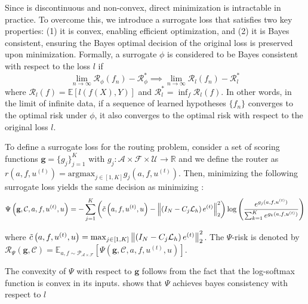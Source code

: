 \documentclass{article} %
\begin{document}
Since  is discontinuous and non-convex, direct minimization is intractable in practice. To overcome this, we introduce a surrogate loss that satisfies two key properties: (1) it is convex, enabling efficient optimization, and (2) it is Bayes consistent, ensuring the Bayes optimal decision of the original loss is preserved upon minimization. Formally, a surrogate $\phi$ is considered to be Bayes consistent with respect to the loss $l$ if 
\begin{equation*}
    \lim_{n \to \infty} \mathcal{R}_{\phi}(f_n) - \mathcal{R}_{\phi}^* \implies \lim_{n \to \infty} \mathcal{R}_{l}(f_n) - \mathcal{R}_{l}^* 
\end{equation*}
where $\mathcal{R}_{l}(f) = \mathbb{E}\left[l(f(X), Y)\right]$ and $\mathcal{R}_{l}^* = \inf_f\mathcal{R}_{l}(f)$. In other words, in the limit of infinite data, if a sequence of learned hypotheses $\{f_n\}$ converges to the optimal risk under $\phi$, it also converges to the optimal risk with respect to the original loss $l$.

To define a surrogate loss for the routing problem, consider a set of scoring functions $\mathbf{g} =\{g_j\}_{j = 1}^K$ with $g_j: \mathcal{A} \times \mathcal{F} \times \mathcal{U} \to \mathbb{R}$ and we define the router as $r(a, f, u^{(t)}) = \text{argmax}_{j \in [1, K]} g_j(a, f, u^{(t)})$. Then, minimizing the following surrogate loss yields the same decision as minimizing :
\begin{equation} \label{eq:routersurrogate}
    \Psi\left(\mathbf{g}, \mathcal{C}, a, f, u^{(t)}, u\right) = -\sum_{j = 1}^K \left(\Tilde{c}\left(a, f, u^{(t)}, u\right) -\left\|\left( I_N - C_{j} \mathcal{L}_{h}\right)e^{(t)}\right\|^2_2\right) \log\left(\frac{e^{g_j(a, f, u^{(t)})}}{\sum_{k = 1}^Ke^{g_k(a, f, u^{(t)})}}\right)%
\end{equation}

where 
$\Tilde{c}\left(a,f, u^{(t)}, u\right) = \max_{j \in [1, K]} \left\|\left( I_N - C_{j} \mathcal{L}_{h}\right)e^{(t)}\right\|^2_2$. The $\Psi$-risk is denoted by $\mathcal{R}_{\Psi}\left(\mathbf{g}, \mathcal{C}\right) = \mathbb{E}_{a, f \sim \mathcal{P}_{\mathcal{A} \times \mathcal{F}}}\left[\Psi\left(\mathbf{g}, \mathcal{C}, a, f, u^{(t)}, u\right)\right]$. 

The convexity of $\Psi$ with respect to $\mathbf{g}$ follows from the fact that the log-softmax function is convex in its inputs.  shows that $\Psi$ achieves bayes consistency with respect to $l$
\end{document}
